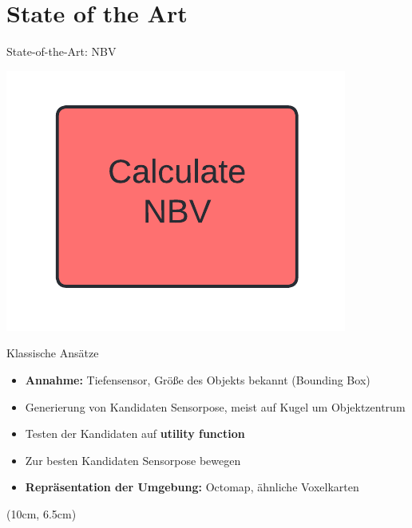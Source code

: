 \documentclass{beamer}
\begin{document}
\section{State of the Art}
\begin{frame}{State-of-the-Art: NBV}
	\vspace{-1cm}
	\hfill
	\begin{minipage}{0.2\textwidth}
		\includegraphics[width=\textwidth]{Graphics/nbv_flow.png}
	\end{minipage}
	\vspace{-0.5cm}
	\begin{block}{Klassische Ansätze}
		\begin{itemize}
			\item \textbf{Annahme:} Tiefensensor, Größe des Objekts bekannt (Bounding Box)
			\item Generierung von Kandidaten Sensorpose, meist auf Kugel um Objektzentrum
			\item Testen der Kandidaten auf \textbf{utility function}
			\item Zur besten Kandidaten Sensorpose bewegen
			\item \textbf{Repräsentation der Umgebung:} Octomap, ähnliche Voxelkarten
		\end{itemize}
		\cite{zeng_view_2020}
	\end{block}
	\begin{textblock*}{0.2\textwidth}(10cm, 6.5cm)

\end{textblock*}
\end{frame}
\end{document}
